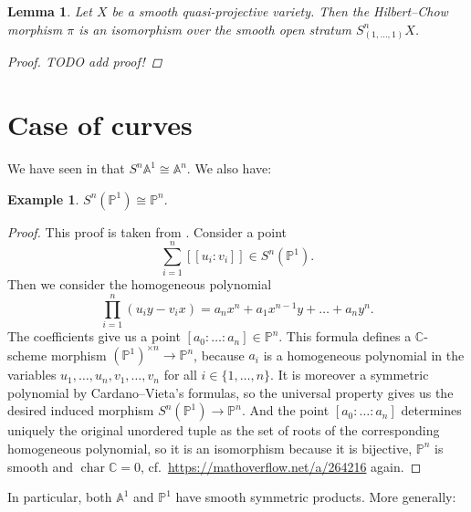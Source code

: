 \documentclass[12pt,a4paper]{amsart}
\theoremstyle{plain}
\newtheorem{lm}[thm]{Lemma}
\theoremstyle{definition}
\newtheorem{exmp}[thm]{Example}
\theoremstyle{remark}
\begin{document}
\begin{lm}\label{lm:overstratum}
  Let $X$ be a smooth quasi-projective variety.
  Then the Hilbert--Chow morphism $\pi$ is an isomorphism over the smooth open stratum $S^{n}_{(1,\ldots,1)}X$.
  \begin{proof}
    \color{red} TODO add proof! \color{black}
  \end{proof}
\end{lm}

\section{Case of curves}

We have seen in  that $S^{n}\mathbb{A}^{1} \cong \mathbb{A}^{n}$.
We also have:

\begin{exmp}\label{exmp:projectiveline}
  $S^{n}(\mathbb{P}^{1}) \cong \mathbb{P}^{n}$.

  \begin{proof}
    This proof is taken from \cite[Example 3.4]{rot16}.
    Consider a point
    \[ \sum_{i = 1}^{n} [[u_{i}:v_{i}]] \in S^{n}(\mathbb{P}^{1}). \]
    Then we consider the homogeneous polynomial
    \[ \prod_{i = 1}^{n} (u_{i}y - v_{i}x) = a_{n} x^{n} + a_{1} x^{n-1}y + \ldots + a_{n}y^{n}. \]
    The coefficients give us a point $[a_{0} : \ldots : a_{n} ] \in \mathbb{P}^{n}$.
    This formula defines a $\mathbb{C}$-scheme morphism $(\mathbb{P}^{1})^{\times n} \to \mathbb{P}^{n}$, because $a_{i}$ is a homogeneous polynomial in the variables $u_{1}, \ldots, u_{n}, v_{1}, \ldots, v_{n}$ for all $i \in \{ 1 , \ldots, n\}$.
    It is moreover a symmetric polynomial by Cardano--Vieta's formulas, so the universal property gives us the desired induced morphism $S^{n}(\mathbb{P}^{1}) \to \mathbb{P}^{n}$.
    And the point $[a_{0} : \ldots : a_{n}]$ determines uniquely the original unordered tuple as the set of roots of the corresponding homogeneous polynomial, so it is an isomorphism because it is bijective, $\mathbb{P}^{n}$ is smooth and $\operatorname{char}{\mathbb{C}} = 0$, cf.~\url{https://mathoverflow.net/a/264216} again.
  \end{proof}
\end{exmp}

In particular, both $\mathbb{A}^{1}$ and $\mathbb{P}^{1}$ have smooth symmetric products.
More generally:
\end{document}
